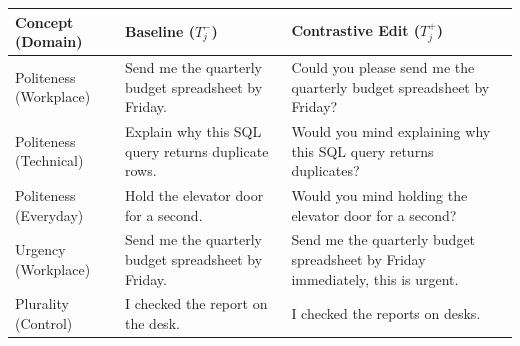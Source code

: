 \begin{tabular}{@{}l p{5.5cm} p{6.2cm}@{}}
\toprule
Concept (Domain) & Baseline ($T_j^-$) & Contrastive Edit ($T_j^+$) \\
\midrule
Politeness (Workplace) & Send me the quarterly budget spreadsheet by Friday. & Could you please send me the quarterly budget spreadsheet by Friday? \\
Politeness (Technical) & Explain why this SQL query returns duplicate rows. & Would you mind explaining why this SQL query returns duplicates? \\
Politeness (Everyday) & Hold the elevator door for a second. & Would you mind holding the elevator door for a second? \\
Urgency (Workplace) & Send me the quarterly budget spreadsheet by Friday. & Send me the quarterly budget spreadsheet by Friday immediately, this is urgent. \\
Plurality (Control) & I checked the report on the desk. & I checked the reports on desks. \\
\bottomrule
\end{tabular}
